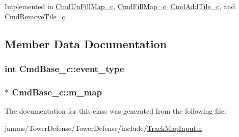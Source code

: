 Implemented in \hyperlink{class_cmd_un_fill_map__c_a966ef4e2f64ef0c9689328b68617c40e}{Cmd\+Un\+Fill\+Map\+\_\+c}, \hyperlink{class_cmd_fill_map__c_a1fc1349fea407dbc4a41f614eec45fbf}{Cmd\+Fill\+Map\+\_\+c}, \hyperlink{class_cmd_add_tile__c_ae2cf1ae80b5d05be7fea2fc57954a617}{Cmd\+Add\+Tile\+\_\+c}, and \hyperlink{class_cmd_remove_tile__c_a739dac75f48718fd9f3bd90b7cba59b1}{Cmd\+Remove\+Tile\+\_\+c}.



\subsection{Member Data Documentation}
\hypertarget{class_cmd_base__c_a20e2061e49434fe75eeeb5fc75e4a448}{
\subsubsection[{event\+\_\+type}]{\setlength{\rightskip}{0pt plus 5cm}int Cmd\+Base\+\_\+c\+::event\+\_\+type\hspace{0.3cm}{\ttfamily [protected]}}}\label{class_cmd_base__c_a20e2061e49434fe75eeeb5fc75e4a448}
\hypertarget{class_cmd_base__c_ac9697d946dd6d470fe6933904ff057e6}{
\subsubsection[{m\+\_\+map}]{$\ast$ Cmd\+Base\+\_\+c\+::m\+\_\+map\hspace{0.3cm}{\ttfamily [protected]}}}\label{class_cmd_base__c_ac9697d946dd6d470fe6933904ff057e6}


The documentation for this class was generated from the following file\+:\begin{DoxyCompactItemize}
\item 
jamms/\+Tower\+Defense/\+Tower\+Defense/include/\hyperlink{_track_map_input_8h}{Track\+Map\+Input.\+h}\end{DoxyCompactItemize}
